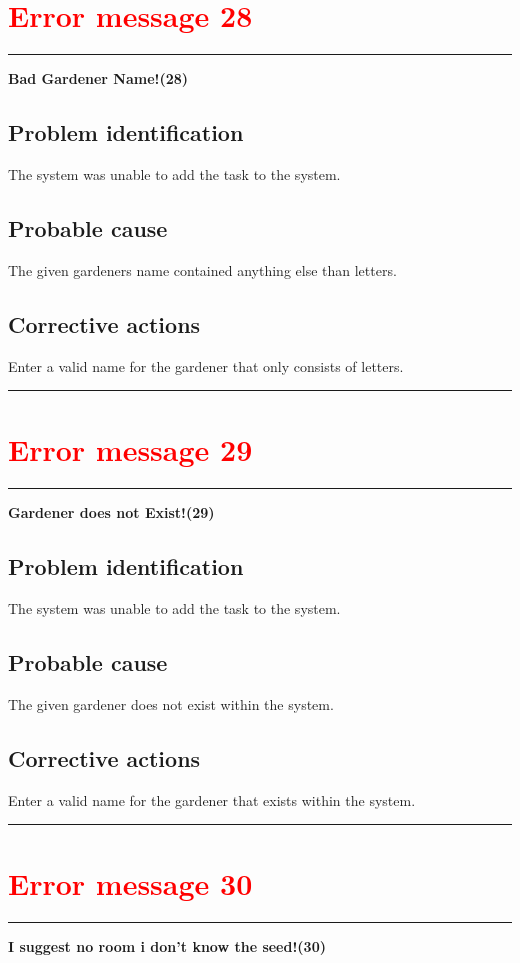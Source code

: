 \section{\textbf{\textcolor{red}{Error message 28}}}
\hrule
\vspace{0.5cm}
\textbf{Bad Gardener Name!(28)}
\subsection{Problem identification}
The system was unable to add the task to the system.

\subsection{Probable cause}
The given gardeners name contained anything else than letters.

\subsection{Corrective actions}
Enter a valid name for the gardener that only consists of letters.
\vspace{0.5cm}
\hrule
\hfill
\break


\section{\textbf{\textcolor{red}{Error message 29}}}
\hrule
\vspace{0.5cm}
\textbf{Gardener does not Exist!(29)}
\subsection{Problem identification}
The system was unable to add the task to the system.

\subsection{Probable cause}
The given gardener does not exist within the system.

\subsection{Corrective actions}
Enter a valid name for the gardener that exists within the system.
\vspace{0.5cm}
\hrule
\hfill



\section{\textbf{\textcolor{red}{Error message 30}}}
\hrule
\vspace{0.5cm}
\textbf{I suggest no room i don't know the seed!(30)}
